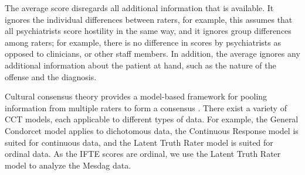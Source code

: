 \documentclass[a4paper,11pt]{article}
\begin{document}
The average score disregards all additional information that is available.
It ignores the individual differences between raters, for example, this assumes that all psychiatrists score hostility in the same way, and it ignores group differences among raters; for example, there is no difference in scores by psychiatrists as opposed to clinicians, or other staff members.
In addition, the average ignores any additional information about the patient at hand, such as the nature of the offense and the diagnosis.

Cultural consensus theory provides a model-based framework for pooling information from multiple raters to form a consensus \parencite{anders2014cultural}.
There exist a variety of CCT models, each applicable to different types of data.
For example, the General Condorcet model \parencite{Batchelder1986statistical} applies to dichotomous data, the Continuous Response model \parencite{anders2014cultural} is suited for continuous data, and the Latent Truth Rater model \parencite{Anders2015cultural} is suited for ordinal data.
As the IFTE scores are ordinal, we use the Latent Truth Rater model to analyze the Mesdag data.
\end{document}
